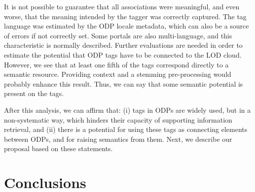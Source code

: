 

It is not possible to guarantee that all associations were meaningful, and even worse, that the meaning intended by the tagger was correctly captured.
The tag language was estimated by the ODP locale metadata, which can also be a source of errors if not correctly set.
Some portals are also multi-language, and this characteristic is normally described.
Further evaluations are needed in order to estimate the potential that ODP tags have to be connected to the LOD cloud.
However, we see that at least one fifth of the tags correspond directly to a semantic resource.
Providing context and a stemming pre-processing would probably enhance this result.
Thus, we can say that some semantic potential is present on the tags.

\hspace{0.2pt}

After this analysis, we can affirm that: (i) tags in ODPs are widely used, but in a non-systematic way, which hinders their capacity of supporting information retrieval, and (ii) there is a potential for using these tags as connecting elements between ODPs, and for raising semantics from them.
Next, we describe our proposal based on these statements.

\section{Conclusions}




